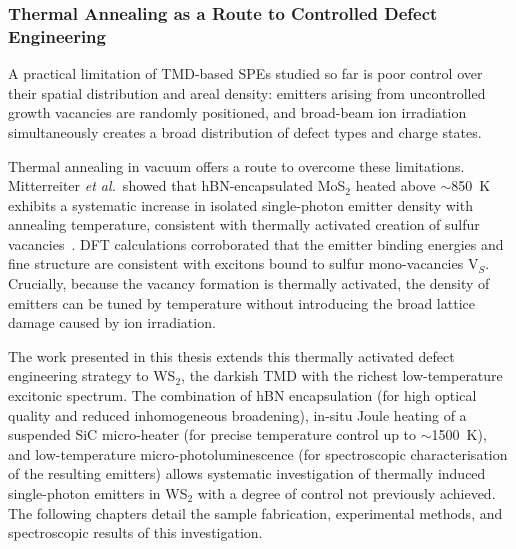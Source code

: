 \subsubsection{Thermal Annealing as a Route to Controlled Defect Engineering}

A practical limitation of TMD-based SPEs studied so far is poor control over their spatial distribution and areal density: emitters arising from uncontrolled growth vacancies are randomly positioned, and broad-beam ion irradiation simultaneously creates a broad distribution of defect types and charge states.

Thermal annealing in vacuum offers a route to overcome these limitations.
Mitterreiter \textit{et al.}\ showed that hBN-encapsulated MoS$_2$ heated above $\sim$850~K exhibits a systematic increase in isolated single-photon emitter density with annealing temperature, consistent with thermally activated creation of sulfur vacancies~\cite{mitterreiter2021role}.
DFT calculations corroborated that the emitter binding energies and fine structure are consistent with excitons bound to sulfur mono-vacancies V$_S$.
Crucially, because the vacancy formation is thermally activated, the density of emitters can be tuned by temperature without introducing the broad lattice damage caused by ion irradiation.


The work presented in this thesis extends this thermally activated defect engineering strategy to WS$_2$, the darkish TMD with the richest low-temperature excitonic spectrum.
The combination of hBN encapsulation (for high optical quality and reduced inhomogeneous broadening), in-situ Joule heating of a suspended SiC micro-heater (for precise temperature control up to $\sim$1500~K), and low-temperature micro-photoluminescence (for spectroscopic characterisation of the resulting emitters) allows systematic investigation of thermally induced single-photon emitters in WS$_2$ with a degree of control not previously achieved.
The following chapters detail the sample fabrication, experimental methods, and spectroscopic results of this investigation.

\printbibliography[heading=subbibintoc]
